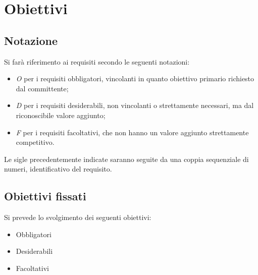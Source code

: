 \section*{Obiettivi}
\subsection*{Notazione}
Si farà riferimento ai requisiti secondo le seguenti notazioni:
\begin{itemize}
	\item \textit{O} per i requisiti obbligatori, vincolanti in quanto obiettivo primario richiesto dal committente;
	\item \textit{D} per i requisiti desiderabili, non vincolanti o strettamente necessari, ma dal riconoscibile valore aggiunto;
 \item \textit{F} per i requisiti facoltativi, che non hanno un valore aggiunto strettamente competitivo.
\end{itemize}

Le sigle precedentemente indicate saranno seguite da una coppia sequenziale di numeri, identificativo del requisito.

\subsection*{Obiettivi fissati}
Si prevede lo svolgimento dei seguenti obiettivi:
\begin{itemize}
	\item Obbligatori
	\begin{itemize}
		\obiettiviObbligatori
	\end{itemize}
	
	\item Desiderabili 
	\begin{itemize}
		\obiettiviDesiderabili
	\end{itemize}

	\item Facoltativi 
	\begin{itemize}
		\obiettiviFacoltativi
	\end{itemize}
\end{itemize}

\newpage